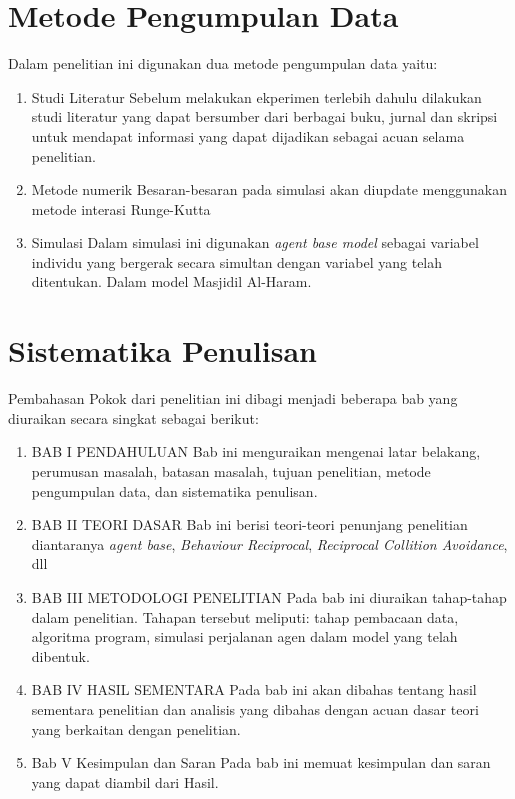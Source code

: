 \section{Metode Pengumpulan Data}\label{sec:metode}
\hspace{0.6cm}Dalam penelitian ini digunakan dua metode pengumpulan data yaitu:
\begin{enumerate} 
\item{Studi Literatur}
Sebelum melakukan ekperimen terlebih dahulu dilakukan studi literatur yang dapat bersumber dari berbagai buku, jurnal  dan skripsi untuk mendapat informasi yang dapat dijadikan sebagai acuan selama penelitian.
\item{Metode numerik}
Besaran-besaran pada simulasi akan diupdate menggunakan
metode interasi Runge-Kutta
\item{Simulasi}
Dalam simulasi ini digunakan \emph{agent base model}  sebagai variabel individu yang bergerak secara simultan dengan variabel yang telah ditentukan. Dalam model Masjidil Al-Haram.    

\end{enumerate}


\section{Sistematika Penulisan}\label{sec:sistematika}
\hspace{0.6cm}Pembahasan Pokok dari penelitian ini dibagi menjadi beberapa bab yang diuraikan secara singkat sebagai berikut:

\begin{enumerate}
\item{BAB I PENDAHULUAN
Bab ini menguraikan mengenai latar belakang, perumusan masalah, batasan masalah, tujuan penelitian, metode pengumpulan data, dan sistematika penulisan.}	

\item{BAB II TEORI DASAR
Bab ini berisi teori-teori penunjang penelitian diantaranya \emph{agent base}, \emph{Behaviour Reciprocal}, \emph{Reciprocal Collition Avoidance}, dll} 

\item{BAB III METODOLOGI PENELITIAN
Pada bab ini diuraikan tahap-tahap dalam penelitian. Tahapan tersebut meliputi: tahap pembacaan data, algoritma program, simulasi perjalanan agen  dalam model yang telah dibentuk.}

\item{BAB IV HASIL SEMENTARA
Pada bab ini akan dibahas tentang hasil sementara penelitian dan analisis yang dibahas dengan acuan dasar teori yang berkaitan dengan penelitian.}

\item{Bab V Kesimpulan dan Saran 
Pada bab ini memuat kesimpulan dan saran yang dapat diambil dari Hasil.
}
\end{enumerate}



%